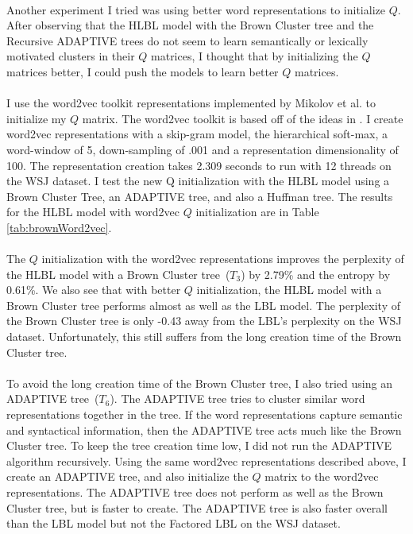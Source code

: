 \paragraph{}
Another experiment I tried was using better word representations to initialize $Q$. After observing that the HLBL model with the Brown Cluster tree and the Recursive ADAPTIVE trees do not seem to learn semantically or lexically motivated clusters in their $Q$ matrices, I thought that by initializing the $Q$ matrices better, I could push the models to learn better $Q$ matrices. 
\paragraph{}
I use the word2vec toolkit representations implemented by Mikolov et al. to initialize my $Q$ matrix. The word2vec toolkit is based off of the ideas in \cite{Mikolov2013}. I create word2vec representations with a skip-gram model, the hierarchical soft-max, a word-window of 5, down-sampling of .001 and a representation dimensionality of 100. The representation creation takes 2.309 seconds to run with 12 threads on the WSJ dataset.  I test the new Q initialization with the HLBL model using a Brown Cluster Tree, an ADAPTIVE tree, and also a Huffman tree. The results for the HLBL model with word2vec $Q$ initialization are in Table \ref{tab:brownWord2vec}.

\paragraph{}
The $Q$ initialization with the word2vec representations improves the perplexity of the HLBL model with a Brown Cluster tree~($T_3$) by 2.79\% and the entropy by 0.61\%. We also see that with better $Q$ initialization, the HLBL model with a Brown Cluster tree performs almost as well as the LBL model. The perplexity of the Brown Cluster tree is only -0.43 away from the LBL's perplexity on the WSJ dataset. Unfortunately, this still suffers from the long creation time of the Brown Cluster tree.
\paragraph{}
To avoid the long creation time of the Brown Cluster tree, I also tried using an ADAPTIVE tree~($T_6$). The ADAPTIVE tree tries to cluster similar word representations together in the tree. If the word representations capture semantic and syntactical information, then the ADAPTIVE tree acts much like the Brown Cluster tree. To keep the tree creation time low, I did not run the ADAPTIVE algorithm recursively. Using the same word2vec representations described above, I create an ADAPTIVE tree, and also initialize the $Q$ matrix to the word2vec representations. The ADAPTIVE tree does not perform as well as the Brown Cluster tree, but is faster to create. The ADAPTIVE tree is also faster overall than the LBL model but not the Factored LBL on the WSJ dataset.

